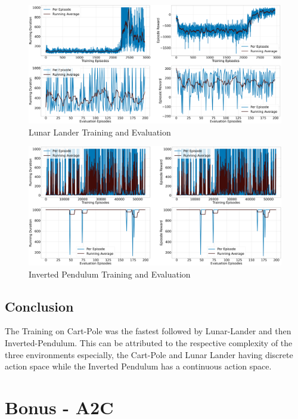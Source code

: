 \documentclass{article} %
\begin{document}
\begin{figure}[H]
    \begin{center}
        \includegraphics[width=\textwidth]{qac_lunar.png}
    \end{center}
    \caption{Lunar Lander Training and Evaluation}
\end{figure}

\begin{figure}[H]
    \begin{center}
        \includegraphics[width=\textwidth]{qac_invpendulum.png}
    \end{center}
    \caption{Inverted Pendulum Training and Evaluation}
\end{figure}

\subsection{Conclusion}
The Training on Cart-Pole was the fastest followed by Lunar-Lander and then Inverted-Pendulum. This can be attributed to the respective complexity of the three environments especially, the Cart-Pole and Lunar Lander having discrete action space while the Inverted Pendulum has a continuous action space.

\section{Bonus - A2C}
\end{document}
